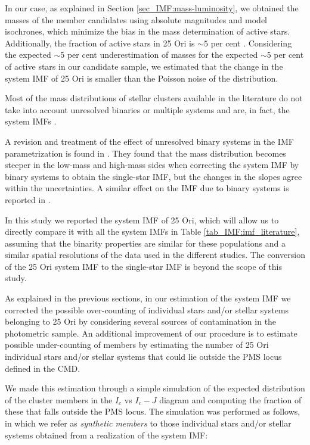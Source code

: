 \documentclass[12pt]{article}
\newcounter{subsubsubsection}[subsubsection]
\begin{document}
In our case, as explained in Section \ref{sec_IMF:mass-luminosity}, we obtained the masses of the member candidates using absolute magnitudes and model isochrones, which minimize the bias in the mass determination of active stars. Additionally, the fraction of active stars in 25 Ori is $\sim 5$ per cent \citep[][]{Briceno2005,Briceno2007,Hernandez2007a,Downes2014,Briceno2018}. Considering the expected $\sim$5 per cent underestimation of masses for the expected $\sim$5 per cent of active stars in our candidate sample, we estimated that the change in the system IMF of 25 Ori is smaller than the Poisson noise of the distribution.

Most of the mass distributions of stellar clusters available in the literature do not take into account unresolved binaries or multiple systems and are, in fact, the system IMFs \citep[e.g. Table \ref{tab_IMF:imf_literature} and ][]{Bastian2010}.

A revision and treatment of the effect of unresolved binary systems in the IMF parametrization is found in \citet{Muzic2017}. They found that the mass distribution becomes steeper in the low-mass and high-mass sides when correcting the system IMF by binary systems to obtain the single-star IMF, but the changes in the slopes agree within the uncertainties. A similar effect on the IMF due to binary systems is reported in \citet{Kroupa2001b}.

In this study we reported the system IMF of 25 Ori, which will allow us to directly compare it with all the system IMFs in Table \ref{tab_IMF:imf_literature}, assuming that the binarity properties are similar for these populations and a similar spatial resolutions of the data used in the different studies. The conversion of the 25 Ori system IMF to the single-star IMF is beyond the scope of this study.

\label{sec_IMF:missed}
As explained in the previous sections, in our estimation of the system IMF we corrected the possible over-counting of individual stars and/or stellar systems belonging to 25 Ori by considering several sources of contamination in the photometric sample. An additional improvement of our procedure is to estimate possible under-counting of members by estimating the number of 25 Ori individual stars and/or stellar systems that could lie outside the PMS locus defined in the CMD.

We made this estimation through a simple simulation of the expected distribution of the cluster members in the $I_c$ vs $I_c-J$ diagram and computing the fraction of these that falls outside the PMS locus. The simulation was performed as follows, in which we refer as \emph{synthetic members} to those individual stars and/or stellar systems obtained from a realization of the system IMF:
\end{document}
